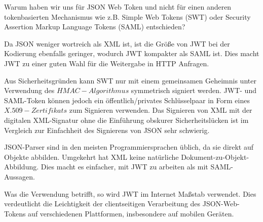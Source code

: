Warum haben wir uns für JSON Web Token und nicht für einen anderen tokenbasierten Mechanismus wie z.B. Simple Web Tokens (SWT) oder Security Assertion Markup Language Tokens (SAML) entschieden?

Da JSON weniger wortreich als XML ist, ist die Größe von JWT bei der Kodierung ebenfalls geringer, wodurch JWT kompakter als SAML ist. Dies macht JWT zu einer guten Wahl für die Weitergabe in HTTP Anfragen.

Aus Sicherheitsgründen kann SWT nur mit einem gemeinsamen Geheimnis unter Verwendung des $HMAC-Algorithmus$ symmetrisch signiert werden. JWT- und SAML-Token können jedoch ein öffentlich/privates Schlüsselpaar in Form eines $X.509-Zertifikats$ zum Signieren verwenden. Das Signieren von XML mit der digitalen XML-Signatur ohne die Einführung obskurer Sicherheitslücken ist im Vergleich zur Einfachheit des Signierens von JSON sehr schwierig.

JSON-Parser sind in den meisten Programmiersprachen üblich, da sie direkt auf Objekte abbilden. Umgekehrt hat XML keine natürliche Dokument-zu-Objekt-Abbildung. Dies macht es einfacher, mit JWT zu arbeiten als mit SAML-Aussagen.

Was die Verwendung betrifft, so wird JWT im Internet Maßstab verwendet. Dies verdeutlicht die Leichtigkeit der clientseitigen Verarbeitung des JSON-Web-Tokens auf verschiedenen Plattformen, insbesondere auf mobilen Geräten.
